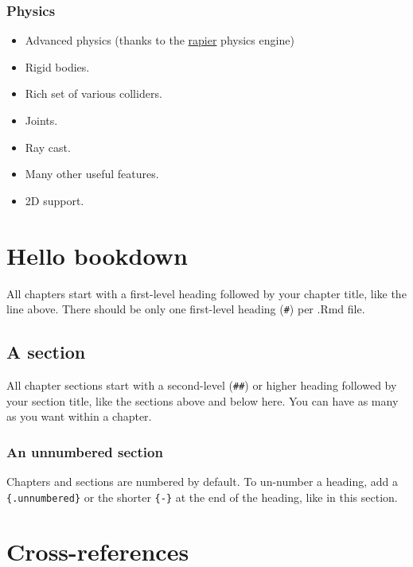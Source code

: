 \documentclass[
]{book}
\providecommand{\tightlist}{%
  \setlength{\itemsep}{0pt}\setlength{\parskip}{0pt}}
\theoremstyle{definition}
\theoremstyle{definition}
\theoremstyle{definition}
\theoremstyle{definition}
\theoremstyle{remark}
\begin{document}
\subsection{Physics}\label{physics}

\begin{itemize}
\tightlist
\item
  Advanced physics (thanks to the \href{https://github.com/dimforge/rapier}{rapier} physics engine)
\item
  Rigid bodies.
\item
  Rich set of various colliders.
\item
  Joints.
\item
  Ray cast.
\item
  Many other useful features.
\item
  2D support.
\end{itemize}

\chapter{Hello bookdown}\label{hello-bookdown}

All chapters start with a first-level heading followed by your chapter title, like the line above. There should be only one first-level heading (\texttt{\#}) per .Rmd file.

\section{A section}\label{a-section}

All chapter sections start with a second-level (\texttt{\#\#}) or higher heading followed by your section title, like the sections above and below here. You can have as many as you want within a chapter.

\subsection*{An unnumbered section}\label{an-unnumbered-section}

Chapters and sections are numbered by default. To un-number a heading, add a \texttt{\{.unnumbered\}} or the shorter \texttt{\{-\}} at the end of the heading, like in this section.

\chapter{Cross-references}\label{cross}
\end{document}
